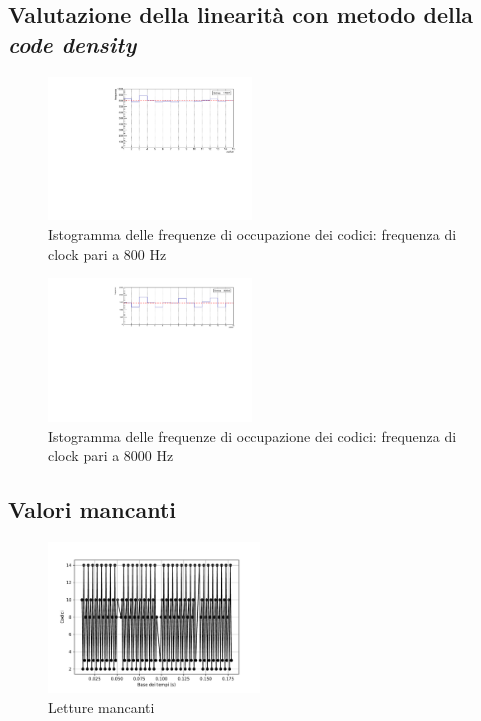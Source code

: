 \documentclass[journal]{IEEEtran}
\begin{document}
\subsection{Valutazione della linearità con metodo della \textit{code density}}

\begin{figure}[H]%
\begin{center}
\includegraphics[width=0.48\textwidth]{analysis/output/dnl_800_hz.pdf}
\caption{Istogramma delle frequenze di occupazione dei codici: frequenza di clock pari a 800 Hz}
\label{fig:graph_dnl_800_hz}
\end{center}
\end{figure}



\begin{figure}[H]%
\begin{center}
\includegraphics[width=0.48\textwidth]{analysis/output/dnl_8000_hz_S28.pdf}
\caption{Istogramma delle frequenze di occupazione dei codici: frequenza di clock pari a 8000 Hz}
\label{fig:graph_dnl_8000_hz_S28}
\end{center}
\end{figure}


\subsection{Valori mancanti}

\begin{figure}[H]%
\begin{center}
\includegraphics[width=0.50\textwidth]{analysis/output/letture_mancanti.pdf}
\caption{Letture mancanti}
\label{fig:missing}
\end{center}
\end{figure}
\end{document}
